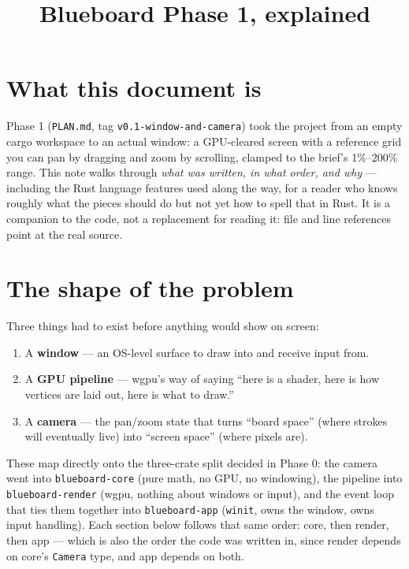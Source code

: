 \documentclass[11pt]{article}
\title{Blueboard Phase 1, explained}
\author{}
\date{}
\begin{document}
\maketitle

\section*{What this document is}
Phase 1 (\texttt{PLAN.md}, tag \texttt{v0.1-window-and-camera}) took the project from an
empty cargo workspace to an actual window: a GPU-cleared screen with a reference grid you
can pan by dragging and zoom by scrolling, clamped to the brief's 1\%--200\% range. This
note walks through \emph{what was written, in what order, and why} — including the Rust
language features used along the way, for a reader who knows roughly what the pieces
should do but not yet how to spell that in Rust. It is a companion to the code, not a
replacement for reading it: file and line references point at the real source.

\tableofcontents

\section{The shape of the problem}

Three things had to exist before anything would show on screen:
\begin{enumerate}
  \item A \textbf{window} — an OS-level surface to draw into and receive input from.
  \item A \textbf{GPU pipeline} — wgpu's way of saying ``here is a shader, here is how
    vertices are laid out, here is what to draw.''
  \item A \textbf{camera} — the pan/zoom state that turns ``board space'' (where strokes
    will eventually live) into ``screen space'' (where pixels are).
\end{enumerate}
These map directly onto the three-crate split decided in Phase 0: the camera went into
\texttt{blueboard-core} (pure math, no GPU, no windowing), the pipeline into
\texttt{blueboard-render} (wgpu, nothing about windows or input), and the event loop that
ties them together into \texttt{blueboard-app} (\texttt{winit}, owns the window, owns
input handling). Each section below follows that same order: core, then render, then app
— which is also the order the code was written in, since render depends on core's
\texttt{Camera} type, and app depends on both.
\end{document}
